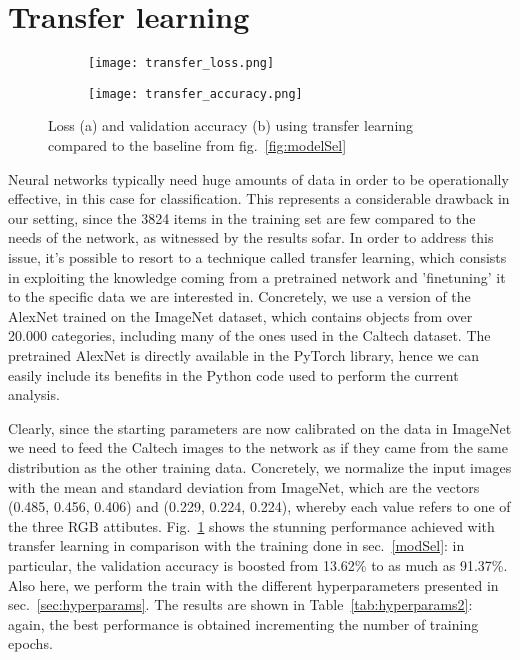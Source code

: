 \documentclass[11pt,twoside,a4paper]{article}
\begin{document}
\section{Transfer learning}
\label{sec:transfer}

\begin{figure}[!b]
    \centering
    \begin{subfigure}{0.4\textwidth}
	\texttt{[image: transfer\_loss.png]}
        \caption{}
    \end{subfigure}
    \begin{subfigure}{0.4\textwidth}
	\texttt{[image: transfer\_accuracy.png]}
        \caption{}
    \end{subfigure}
    \caption{Loss (a) and validation accuracy (b) using transfer learning compared to the baseline from fig.~\ref{fig:modelSel}}
    \label{fig:transfer}
\end{figure}

Neural networks typically need huge amounts of data in order to be operationally effective, in this case for classification. This represents a considerable drawback in our setting, since the 3824 items in the training set are few compared to the needs of the network, as witnessed by the results sofar. In order to address this issue, it's possible to resort to a technique called transfer learning, which consists in exploiting the knowledge coming from a pretrained network and 'finetuning' it to the specific data we are interested in.\newline
Concretely, we use a version of the AlexNet trained on the ImageNet dataset, which contains objects from over 20.000 categories, including many of the ones used in the Caltech dataset. The pretrained AlexNet is directly available in the PyTorch library, hence we can easily include its benefits in the Python code used to perform the current analysis.

Clearly, since the starting parameters are now calibrated on the data in ImageNet we need to feed the Caltech images to the network as if they came from the same distribution as the other training data. Concretely, we normalize the input images with the mean and standard deviation from ImageNet, which are the vectors (0.485, 0.456, 0.406) and (0.229, 0.224, 0.224), whereby each value refers to one of the three RGB attibutes. Fig.~\ref{fig:transfer} shows the stunning performance achieved with transfer learning in comparison with the training done in sec.~\ref{modSel}: in particular, the validation accuracy is boosted from 13.62\% to as much as 91.37\%.\newline
Also here, we perform the train with the different hyperparameters presented in sec.~\ref{sec:hyperparams}. The results are shown in Table~\ref{tab:hyperparams2}: again, the best performance is obtained incrementing the number of training epochs.\newline
\end{document}
